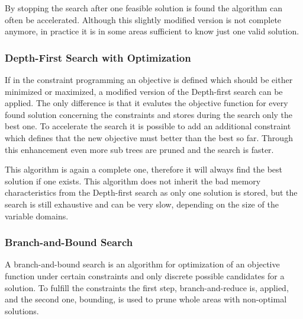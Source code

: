 \documentclass[10pt,
               a4paper,
               journal,
               ]{IEEEtran}
\begin{document}
	By stopping the search after one feasible solution is found the algorithm can often be accelerated. Although this slightly modified version is not complete anymore, in practice it is in some areas sufficient to know just one valid solution.
	
	\subsubsection{Depth-First Search with Optimization}
	If in the constraint programming an objective is defined which should be either minimized or maximized, a modified version of the Depth-first search can be applied. The only difference is that it evalutes the objective function for every found solution concerning the constraints and stores during the search only the best one. To accelerate the search it is possible to add an additional constraint which defines that the new objective must better than the best so far. Through this enhancement even more sub trees are pruned and the search is faster.
	
	This algorithm is again a complete one, therefore it will always find the best solution if one exists. This algorithm does not inherit the bad memory characteristics from the Depth-first search as only one solution is stored, but the search is still exhaustive and can be very slow, depending on the size of the variable domains.
	
	\subsubsection{Branch-and-Bound Search}
	A branch-and-bound search is an algorithm for optimization of an objective function under certain constraints and only discrete possible candidates for a solution. To fulfill the constraints the first step, branch-and-reduce is, applied, and the second one, bounding, is used to prune whole areas with non-optimal solutions.
	
\end{document}

